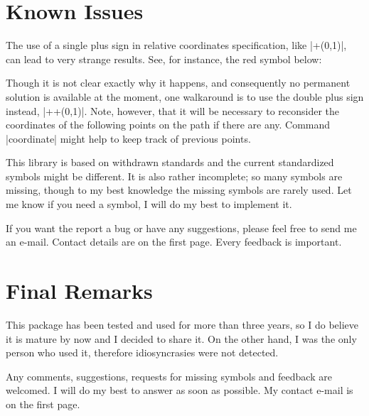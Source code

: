 \documentclass[a4paper]{ltxdoc}
\begin{document}
\section{Known Issues}

The use of a single plus sign in relative coordinates specification, like |+(0,1)|, can lead to very strange results. See, for instance, the red symbol below:

\begin{codeexample}[width=4.2cm]
\end{codeexample}

Though it is not clear exactly why it happens, and consequently no permanent solution is available at the moment, one walkaround is to use the double plus sign instead, |++(0,1)|. Note, however, that it will be necessary to reconsider the coordinates of the following points on the path if there are any. Command |coordinate| might help to keep track of previous points.

This library is based on withdrawn standards and the current standardized symbols might be different. It is also rather incomplete; so many symbols are missing, though to my best knowledge the missing symbols are rarely used. Let me know if you need a symbol, I will do my best to implement it.

If you want the report a bug or have any suggestions, please feel free to send me an e-mail. Contact details are on the first page. Every feedback is important.


\section{Final Remarks}

This package has been tested and used for more than three years, so I do believe it is mature by now and I decided to share it. On the other hand, I was the only person who used it, therefore idiosyncrasies were not detected.

Any comments, suggestions, requests for missing symbols and feedback are welcomed. I will do my best to answer as soon as possible. My contact e-mail is on the first page.
\end{document}
